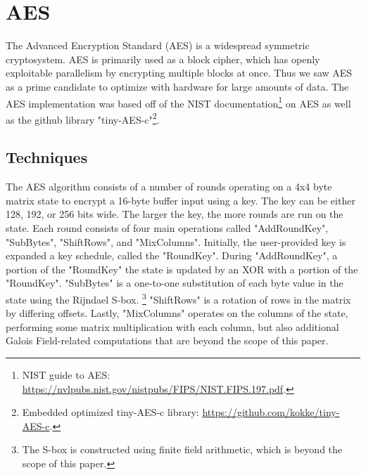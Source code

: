 \section{AES}
The Advanced Encryption Standard (AES) is a widespread symmetric cryptosystem. AES is primarily used as a block cipher, which has openly exploitable parallelism by encrypting multiple blocks at once. Thus we saw AES as a prime candidate to optimize with hardware for large amounts of data. The AES implementation was based off of the NIST documentation\footnote{NIST guide to AES: \url{https://nvlpubs.nist.gov/nistpubs/FIPS/NIST.FIPS.197.pdf}.} on AES as well as the github library "tiny-AES-c"\footnote{Embedded optimized tiny-AES-c library: \url{https://github.com/kokke/tiny-AES-c}.}. 

\subsection{Techniques}
The AES algorithm consists of a number of rounds operating on a 4x4 byte matrix state to encrypt a 16-byte buffer input using a key. The key can be either 128, 192, or 256 bits wide. The larger the key, the more rounds are run on the state. Each round consists of four main operations called "AddRoundKey", "SubBytes", "ShiftRows", and "MixColumns".
Initially, the user-provided key is expanded a key schedule, called the "RoundKey".
During "AddRoundKey", a portion of the "RoundKey" the state is updated by an XOR with a portion of the "RoundKey".
"SubBytes" is a one-to-one substitution of each byte value in the state using the Rijndael S-box. \footnote{The S-box is constructed using finite field arithmetic, which is beyond the scope of this paper.}
"ShiftRows" is a rotation of rows in the matrix by differing offsets.
Lastly, "MixColumns" operates on the columns of the state, performing some matrix multiplication with each column, but also additional Galois Field-related computations that are beyond the scope of this paper.

